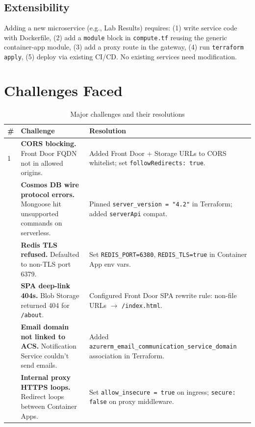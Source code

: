\documentclass[12pt,a4paper]{article}
\begin{document}
\subsection{Extensibility}

Adding a new microservice (e.g., Lab Results) requires: (1) write service code with Dockerfile, (2) add a \texttt{module} block in \texttt{compute.tf} reusing the generic container-app module, (3) add a proxy route in the gateway, (4) run \texttt{terraform apply}, (5) deploy via existing CI/CD. No existing services need modification.

\section{Challenges Faced}

\begin{table}[H]
\centering
\footnotesize
\caption{Major challenges and their resolutions}
\begin{tabularx}{\textwidth}{@{}l X X@{}}
\toprule
\textbf{\#} & \textbf{Challenge} & \textbf{Resolution} \\
\midrule
1 & \textbf{CORS blocking.} Front Door FQDN not in allowed origins. & Added Front Door + Storage URLs to CORS whitelist; set \texttt{followRedirects: true}. \\
\addlinespace
2 & \textbf{Cosmos DB wire protocol errors.} Mongoose hit unsupported commands on serverless. & Pinned \texttt{server\_version = "4.2"} in Terraform; added \texttt{serverApi} compat. \\
\addlinespace
3 & \textbf{Redis TLS refused.} Defaulted to non-TLS port 6379. & Set \texttt{REDIS\_PORT=6380}, \texttt{REDIS\_TLS=true} in Container App env vars. \\
\addlinespace
4 & \textbf{SPA deep-link 404s.} Blob Storage returned 404 for \texttt{/about}. & Configured Front Door SPA rewrite rule: non-file URLs $\to$ \texttt{/index.html}. \\
\addlinespace
5 & \textbf{Email domain not linked to ACS.} Notification Service couldn't send emails. & Added \texttt{azurerm\_email\_communication\_service\_domain} association in Terraform. \\
\addlinespace
6 & \textbf{Internal proxy HTTPS loops.} Redirect loops between Container Apps. & Set \texttt{allow\_insecure = true} on ingress; \texttt{secure: false} on proxy middleware. \\
\bottomrule
\end{tabularx}
\end{table}
\end{document}
